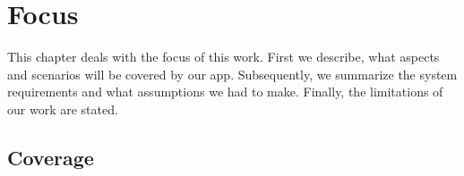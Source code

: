 \section{Focus}
\label{s:assumptions}
This chapter deals with the focus of this work. 
First we describe, what aspects and scenarios will be covered by our app. 
Subsequently, we summarize the system requirements and what assumptions we had to make. 
Finally, the limitations of our work are stated.

\subsection{Coverage}
\label{s:coverage}
